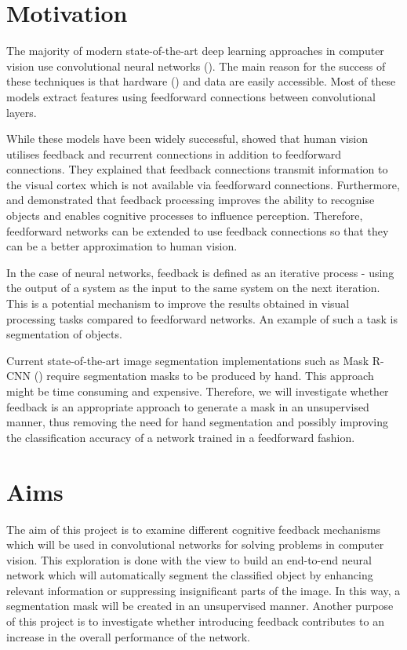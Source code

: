 \documentclass{l4proj}
\begin{document}
\section{Motivation}
The majority of modern state-of-the-art deep learning approaches in computer vision use convolutional neural networks (\cite{convnets}). The main reason for the success of these techniques is that hardware (\cite{GPU}) and data are easily accessible. Most of these models extract features using feedforward connections between convolutional layers. 

While these models have been widely successful, \cite{feedbackcon} showed that human vision utilises feedback and recurrent connections in addition to feedforward connections. They explained that feedback connections transmit information to the visual cortex which is not available via feedforward connections. Furthermore, \cite{cognitive} and \cite{objectrec} demonstrated that feedback processing improves the ability to recognise objects and enables cognitive processes to influence perception.
Therefore, feedforward networks can be extended to use feedback connections so that they can be a better approximation to human vision.

In the case of neural networks, feedback is defined as an iterative process - using the output of a system as the input to the same system on the next iteration. This is a potential mechanism to improve the results obtained in visual processing tasks compared to feedforward networks. An example of such a task is segmentation of objects.

Current state-of-the-art image segmentation implementations such as Mask R-CNN (\cite{maskrcnn}) require segmentation masks to be produced by hand. This approach might be time consuming and expensive. Therefore, we will investigate whether feedback is an appropriate approach to generate a mask in an unsupervised manner, thus removing the need for hand segmentation and possibly improving the classification accuracy of a network trained in a feedforward fashion.

\section{Aims}
The aim of this project is to examine different cognitive feedback mechanisms which will be used in convolutional networks for solving problems in computer vision. This exploration is done with the view to build an end-to-end neural network which will automatically segment the classified object by enhancing relevant information or suppressing insignificant parts of the image. In this way, a segmentation mask will be created in an unsupervised manner. Another purpose of this project is to investigate whether introducing feedback contributes to an increase in the overall performance of the network.
\end{document}
